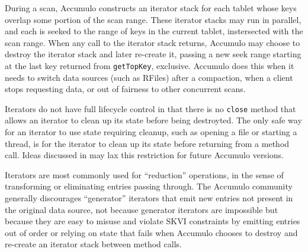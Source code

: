 During a scan, Accumulo constructs an iterator stack for each tablet whose keys overlap some portion 
of the scan range. These iterator stacks may run in parallel, and each is seeked to the range of 
keys in the current tablet, instersected with the scan range. When any call to the iterator stack 
returns, Accumulo may choose to destroy the iterator stack and later re-create it,
passing a new seek range starting at the last key returned from \texttt{getTopKey}, exclusive.
Accumulo does this when it needs to switch data sources (such as RFiles) after a compaction, 
when a client stops requesting data, or out of fairness to other concurrent scans.

Iterators do not have full lifecycle control in that there is no \texttt{close} method 
that allows an iterator to clean up its state before being destroyted. The only safe way for an 
iterator to use state requiring cleanup, such as opening a file or starting a thread,
is for the iterator to clean up its state before returning from a method call.
Ideas discussed in \cite{ACCUMULO-3751} may lax this restriction for future Accumulo versions.


Iterators are most commonly used for ``reduction'' operations, in the sense of transforming
or eliminating entries passing through.  The Accumulo community generally discourages ``generator'' iterators 
that emit new entries not present in the original data source, not because generator iterators are impossible 
but because they are easy to misuse and violate SKVI constraints by emitting entries out of order or 
relying on state that fails when Accumulo chooses to destroy and re-create an iterator stack between method calls.

